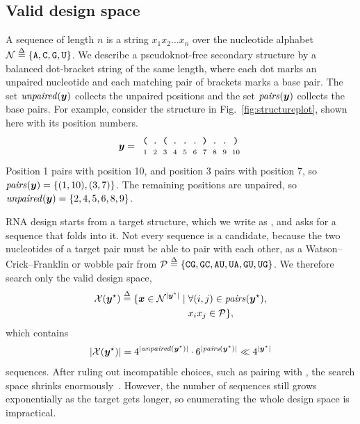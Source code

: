 \subsection{Valid design space}\label{sec:designspace}
A sequence \vecx of length $n$ is a string $x_1x_2\dots x_n$ over the nucleotide alphabet $\mathcal{N}\stackrel{\Delta}{=}\{\text{\tt A},\text{\tt C},\text{\tt G},\text{\tt U}\}$. We describe a pseudoknot-free secondary structure \vecy by a balanced dot-bracket string of the same length, where each dot marks an unpaired nucleotide and each matching pair of brackets marks a base pair. The set $\mathit{unpaired}(\boldsymbol{{y}})$ collects the unpaired positions and the set $\mathit{pairs}(\boldsymbol{{y}})$ collects the base pairs. For example, consider the structure in Fig.~\ref{fig:structureplot}, shown here with its position numbers.
\[
\setlength{\arraycolsep}{2.5pt}
\vecy=\;
\begin{array}{cccccccccc}
\texttt{(} & \texttt{.} & \texttt{(} & \texttt{.} & \texttt{.} & \texttt{.} & \texttt{)} & \texttt{.} & \texttt{.} & \texttt{)}\\[-1pt]
\scriptstyle 1 & \scriptstyle 2 & \scriptstyle 3 & \scriptstyle 4 & \scriptstyle 5 & \scriptstyle 6 & \scriptstyle 7 & \scriptstyle 8 & \scriptstyle 9 & \scriptstyle 10
\end{array}
\]
Position 1 pairs with position 10, and position 3 pairs with position 7, so $\mathit{pairs}(\boldsymbol{{y}})=\{(1,10),(3,7)\}$. The remaining positions are unpaired, so $\mathit{unpaired}(\boldsymbol{{y}})=\{2,4,5,6,8,9\}$.

RNA design starts from a target structure, which we write as \vecystar, and asks for a sequence that folds into it. Not every sequence is a candidate, because the two nucleotides of a target pair must be able to pair with each other, as a Watson--Crick--Franklin or wobble pair from $\mathcal{P}\stackrel{\Delta}{=}\{\text{\tt C}\text{\tt G},\text{\tt G}\text{\tt C},\text{\tt A}\text{\tt U},\text{\tt U}\text{\tt A},\text{\tt G}\text{\tt U},\text{\tt U}\text{\tt G}\}$. We therefore search only the valid design space,
\begin{equation}
\begin{aligned}
\mathcal{X}(\boldsymbol{{y}}^\star)\stackrel{\Delta}{=}\{\boldsymbol{{x}}\in\mathcal{N}^{|\boldsymbol{{y}}^\star|}\mid{}&\forall(i,j)\in\mathit{pairs}(\boldsymbol{{y}}^\star),\\
&x_ix_j\in\mathcal{P}\},
\end{aligned}
\label{eq:validspace}
\end{equation}
which contains
\begin{equation}
|\mathcal{X}(\boldsymbol{{y}}^\star)|=4^{|\mathit{unpaired}(\boldsymbol{{y}}^\star)|}\cdot 6^{|\mathit{pairs}(\boldsymbol{{y}}^\star)|}\ll 4^{|\boldsymbol{{y}}^\star|}
\label{eq:genxsize}
\end{equation}
sequences. After ruling out incompatible choices, such as \nucC{} pairing with \nucA{}, the search space shrinks enormously~\citep{tang2026}. However, the number of sequences still grows exponentially as the target gets longer, so enumerating the whole design space is impractical.

